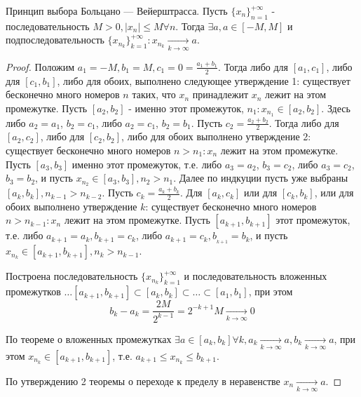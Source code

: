 \documentclass[main]{subfiles}
\begin{document}
\begin{theorem}
    Принцип выбора Больцано — Вейерштрасса. Пусть $\{x_{n}\}_{n=1}^{+\infty}$
    - последовательность $M > 0, |x_n| \leq M \forall n$. Тогда 
    $\exists a, a \in [-M, M]$ и подпоследовательность 
    $\{x_{n_k}\}_{k=1}^{+\infty} : x_{n_k} \underset{k\to\infty}{\to} a$.
\end{theorem}
\begin{proof}
    Положим $a_1 = -M, b_1 = M, c_1 = 0 = \frac{a_1 + b_1}{2}$. Тогда либо для 
    $[a_1, c_1]$, либо для $[c_1, b_1]$, либо для обоих, выполнено следующее 
    утверждение 1: существует бесконечно много номеров $n$ таких, что 
    $x_n$ принадлежит $x_n$ лежит на этом промежутке. Пусть $[a_2, b_2]$ - 
    именно этот промежуток, $n_1 : x_{n_1} \in [a_2, b_2]$. Здесь либо
    $a_2 = a_1$, $b_2 = c_1$, либо $a_2 = c_1$, $b_2 = b_1$. Пусть 
    $c_2 = \frac{a_2 + b_2}{2}$. Тогда либо для $[a_2, c_2]$, либо для 
    $[c_2, b_2]$, либо для обоих выполнено утверждение 2: существует
    бесконечно много номеров $n > n_1 : x_n$ лежит на этом промежутке. 
    Пусть $[a_3, b_3]$ именно этот промежуток, т.е. либо $a_3 = a_2$, 
    $b_3 = c_2$, либо $a_3 = c_2$, $b_3 = b_2$, и пусть $x_{n_2} \in 
    [a_3, b_3], n_2 > n_1$. Далее по индкуции пусть уже выбраны 
    $[a_k, b_k], n_{k-1} > n_{k-2}$. Пусть $c_k = \frac{a_k + b_k}{2}$.
    Для $[a_k, c_k]$ или для $[c_k, b_k]$, или для обоих выполнено утверждение
    $k$: существует бесконечно много номеров $n > n_{k-1} : x_n$ лежит 
    на этом промежутке. Пусть $[a_{k+1}, b_{k+1}]$ этот промежуток, т.е. 
    либо $a_{k+1} = a_k, b_{k+1} = c_k$, либо $a_{k+1} = c_k, b__{k+1} = b_k$,
    и пусть $x_{n_k} \in [a_{k+1}, b_{k+1}], n_k > n_{k - 1}$. 

    Построена последовательность $\{x_{n_k}\}_{k=1}^{+\infty}$ и 
    последовательность вложенных промежутков $\ldots [a_{k+1}, b_{k+1}] 
    \subset [a_k, b_k] \subset \ldots \subset [a_1, b_1]$, при этом 
    \begin{equation*}
        b_k - a_k = \frac{2M}{2^{k-1}} = 2^{-k+1}M \underset{k\to\infty}{\to} 0
    \end{equation*}

    По теореме о вложенных промежутках $\exists a \in [a_k, b_k] \forall k,
    a_k \underset{k\to\infty}{\to} a, b_k \underset{k\to\infty}{\to} a$, 
    при этом $x_{n_k} \in [a_{k+1}, b_{k+1}]$, т.е. $a_{k+1} \leq x_{n_k} \leq 
    b_{k+1}$.

    По утверждению 2 теоремы о переходе к пределу в неравенстве $x_n 
    \underset{k\to\infty}{\to} a$.
\end{proof}
\end{document}
